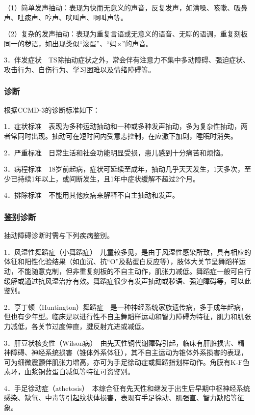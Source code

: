 （1）简单发声抽动：表现为快而无意义的声音，反复发声，如清嗓、咳嗽、吸鼻声、吐痰声、哼声、吠叫声、啊叫声等。

（2）复杂的发声抽动：表现为重复言语或无意义的语音、无聊的语调，重复刻板同一的秽语，如出现类似“滚蛋”、“妈×”的声音。

3．伴发症状　TS除抽动症状之外，常会伴有注意力不集中多动障碍、强迫症状、攻击行为、自伤行为、学习困难以及情绪障碍等。

\subsubsection{诊断}

根据CCMD-3的诊断标准如下：

1．症状标准　表现为多种运动抽动和一种或多种发声抽动，多为复杂性抽动，两者常同时出现。抽动可在短时间内受意志控制，在应激下加剧，睡眠时消失。

2．严重标准　日常生活和社会功能明显受损，患儿感到十分痛苦和烦恼。

3．病程标准　18岁前起病，症状可延续至成年，抽动几乎天天发生，1天多次，至少已持续1年以上，或间断发生，且1年中症状缓解不超过2个月。

4．排除标准　不能用其他疾病来解释不自主抽动和发声。

\subsubsection{鉴别诊断}

抽动障碍诊断时需与下列疾病鉴别。

1．风湿性舞蹈症（小舞蹈症）　儿童较多见，是由于风湿性感染所致，具有相应的体征和阳性化验结果（如血沉、抗“O”及黏蛋白反应等），肢体大关节呈舞蹈样运动，不能随意克制，但非重复刻板的不自主动作，肌张力减低。舞蹈症一般可自行缓解或通过抗风湿治疗有效。舞蹈症很少有发声抽动或秽语、强迫障碍等，可以此鉴别。

2．亨丁顿（Huntington）舞蹈症　是一种神经系统家族遗传病，多于成年起病，但也有少年型。临床是以进行性不自主舞蹈样运动和智力障碍为特征，肌力和肌张力减低，各关节过度伸直，腱反射亢进或减低。

3．肝豆状核变性（Wilson病）　由先天性铜代谢障碍引起，临床有肝脏损害、精神障碍、神经系统损害（锥体外系体征），其不自主运动为锥体外系损害的表现，可为细微震颤伴肌张力增高，亦可为手足徐动症或舞蹈指划样动作。角膜有K-F色素环，血浆铜蓝蛋白减低等特征可资鉴别。

4．手足徐动症（athetosis）　本综合征有先天性和继发于出生后早期中枢神经系统感染、缺氧、中毒等引起纹状体损害，表现有手足徐动、肌强直、智力缺陷等征象。

